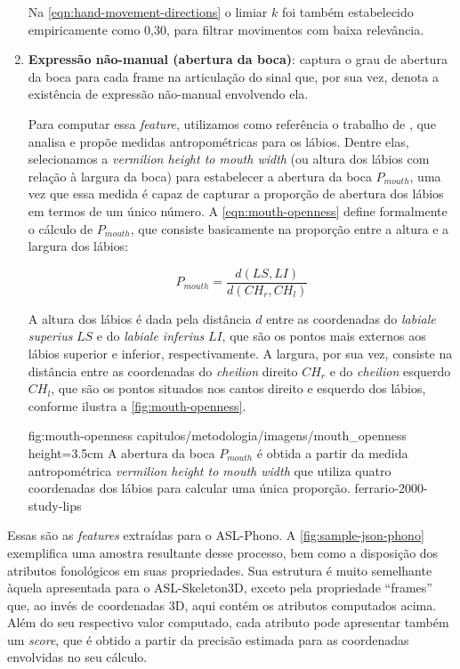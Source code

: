 \begin{enumerate}
          Na \autoref{eqn:hand-movement-directions} o limiar \(k\) foi também estabelecido empiricamente como 0,30, para filtrar movimentos com baixa relevância.


    \item \textbf{Expressão não-manual (abertura da boca)}: captura o grau de abertura da boca para cada frame na articulação do sinal que, por sua vez, denota a existência de expressão não-manual envolvendo ela.

          Para computar essa \textit{feature}, utilizamos como referência o trabalho de , que analisa e propõe medidas antropométricas para os lábios.
          Dentre elas, selecionamos a \textit{vermilion height to mouth width} (ou altura dos lábios com relação à largura da boca) para estabelecer a abertura da boca \(P_{mouth}\), uma vez que essa medida é capaz de capturar a proporção de abertura dos lábios em termos de um único número.
          A \autoref{eqn:mouth-openness} define formalmente o cálculo de \(P_{mouth}\), que consiste basicamente na proporção entre a altura e a largura dos lábios:

          \begin{equation}
              \label{eqn:mouth-openness}
              P_{mouth} = \frac{d(LS, LI)}{d(CH_r, CH_l)}
          \end{equation}

          A altura dos lábios é dada pela distância \(d\) entre as coordenadas do \textit{labiale superius} \(LS\) e do \textit{labiale inferius} \(LI\), que são os pontos mais externos aos lábios superior e inferior, respectivamente. A largura, por sua vez, consiste na distância entre as coordenadas do \textit{cheilion} direito \(CH_r\) e do \textit{cheilion} esquerdo \(CH_l\), que são os pontos situados nos cantos direito e esquerdo dos lábios, conforme ilustra a \autoref{fig:mouth-openness}.

          \figura
          {fig:mouth-openness} %
          {capitulos/metodologia/imagens/mouth_openness} %
          {height=3.5cm} %
          {A abertura da boca \(P_{mouth}\) é obtida a partir da medida antropométrica \textit{vermilion height to mouth width} que utiliza quatro coordenadas dos lábios para calcular uma única proporção.} %
          {ferrario-2000-study-lips} %

\end{enumerate}


Essas são as \textit{features} extraídas para o ASL-Phono.
A \autoref{fig:sample-json-phono} exemplifica uma amostra resultante desse processo, bem como a disposição dos atributos fonológicos em suas propriedades.
Sua estrutura é muito semelhante àquela apresentada para o ASL-Skeleton3D, exceto pela propriedade ``frames'' que, ao invés de coordenadas 3D, aqui contém os atributos computados acima. Além do seu respectivo valor computado, cada atributo pode apresentar também um \textit{score}, que é obtido a partir da precisão estimada para as coordenadas envolvidas no seu cálculo.

